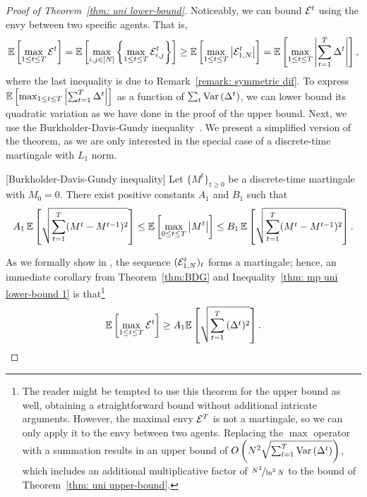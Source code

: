 \begin{proof}[Proof of Theorem~\ref{thm: uni lower-bound}]
    Noticeably, we can bound $\mathcal{E}^t$ using the envy between two specific agents.
    That is,
    \begin{align}\label{thm: mp uni lower-bound 1}
        \mathbb{E}\left[ \max_{1\leq t \leq T} \mathcal{E}^t \right] =
        \mathbb{E}\left[ \max_{i,j \in [N]}{\left\{ \max_{1\leq t \leq T} \mathcal{E}^t_{i,j} \right\}} \right] \geq
        \mathbb{E}\left[ \max_{1\leq t \leq T} \left\lvert\mathcal{E}^t_{1,N}\right\rvert \right] =
        \mathbb{E}\left[ \max_{1\leq t \leq T}\left\lvert\sum^T_{t=1}{{\Delta^t}}\right\rvert  \right],
    \end{align}
    where the last inequality is due to  Remark~\ref{remark: symmetric dif}. To express $\mathbb{E}\left[ \max_{1\leq t \leq T}\left\lvert\sum^T_{t=1}{{\Delta^t}}\right\rvert  \right]$ as a function of $\sum_t\mathrm{Var}\left( {\Delta^t} \right)$, we can lower bound its quadratic variation as we have done in the proof of the upper bound. Next, 
    we use the Burkholder-Davis-Gundy inequality~\cite{davis1970intergrability}. We present a simplified version of the theorem, as we are only interested in the special case of a discrete-time martingale with $L_1$ norm. %
    \begin{theorem}\label{thm:BDG}[Burkholder-Davis-Gundy inequality]
    Let $\{M^t\}_{t \geq 0}$ be a discrete-time martingale with $M_0 = 0$. There exist positive constants $A_1$ and $B_1$ such that 
    \[ 
    A_1 \, \mathbb{E}\left[ \sqrt{\sum_{t=1}^T (M^t - M^{t-1})^2} \right]\leq \mathbb{E}\left[ \max_{0 \leq t \leq T} \left\lvert M^t\right\rvert \right]\leq B_1 \, \mathbb{E}\left[ \sqrt{\sum_{t=1}^T (M^t - M^{t-1})^2} \right].
    \]    
    \end{theorem}
    As we formally show in \ifnum{}\fi, the sequence $(\mathcal{E}^t_{1,N})_t$ forms a martingale; hence, an immediate corollary from Theorem~\ref{thm:BDG} and Inequality~\eqref{thm: mp uni lower-bound 1} is that\footnote{The reader might be tempted to use this theorem for the upper bound as well, obtaining a straightforward bound without additional intricate arguments. However, the maximal envy $\mathcal{E}^T$ is not a martingale, so we can only apply it to the envy between two agents. Replacing the $\max$ operator with a summation results in an upper bound of $O\left(N^2 \sqrt{\sum_{l=1}^{T} \mathrm{Var}\left( {\Delta^t} \right)}\right)$, which includes an  additional multiplicative factor of $\nicefrac{N^2}{\ln^2 N}$ to the bound of Theorem~\ref{thm: uni upper-bound}.}
    \begin{align}\label{eq: gdgggsds}
    \mathbb{E}\left[ \max_{1\leq t \leq T} \mathcal{E}^t \right] \geq A_1 \mathbb{E}\left[  \sqrt{\sum^T_{t=1}{ ({\Delta^t})^2}}  \right].
    \end{align}
    

\end{proof}

